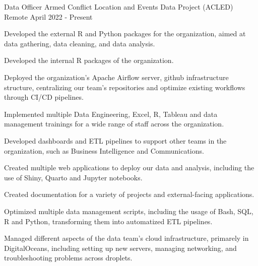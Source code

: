 

\begin{cventries}

  \cventry
    {Data Officer} %
    {Armed Conflict Location and Events Data Project (ACLED)} %
    {Remote} %
    {April 2022 - Present} %
    {
      \begin{cvitems} %
        \item {Developed the external R and Python packages for the organization, aimed at data gathering, data cleaning, and data analysis.}
        \item {Developed the internal R packages of the organization.}
        \item {Deployed the organization's Apache Airflow server, github infrastructure structure, centralizing our team's repositories and optimize existing workflows through CI/CD pipelines.}
        \item {Implemented multiple Data Engineering, Excel, R, Tableau and data management trainings for a wide range of staff across the organization.}
        \item {Developed dashboards and ETL pipelines to support other teams in the organization, such as Business Intelligence and Communications.}
        \item {Created multiple web applications to deploy our data and analysis, including the use of Shiny, Quarto and Jupyter notebooks.}
        \item {Created documentation for a variety of projects and external-facing applications.}
        \item {Optimized multiple data management scripts, including the usage of Bash, SQL, R and Python, transforming them into automatized ETL pipelines.}
        \item {Managed different aspects of the data team's cloud infrastructure, primarely in DigitalOceans, including setting up new servers, managing networking, and troubleshooting problems across droplets.}
      \end{cvitems}
    }



\end{cventries}
